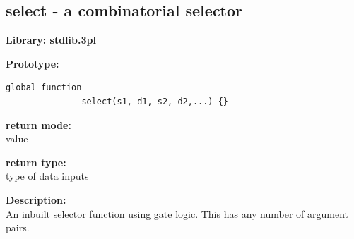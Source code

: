 %
%
%
%
%
%
%





        \subsection{select - a combinatorial selector}\label{sec:lfselect}

            {\bf Library: stdlib.3pl}

            {\bf Prototype:} \\
            \vsp
            \begin{lstlisting}[gobble=12, language=threepl]
               global function
               select(s1, d1, s2, d2,...) {}
            \end{lstlisting}

            {\bf return mode:} \\
            value

            {\bf return type:} \\
            type of data inputs

            {\bf Description:} \\
            An inbuilt selector function using gate logic.
            This has any number of argument pairs.

